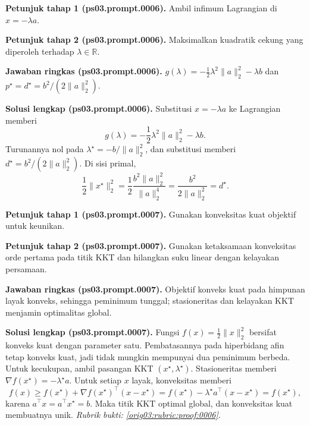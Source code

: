 \par\noindent\textbf{Petunjuk tahap 1 (ps03.prompt.0006).}
Ambil infimum Lagrangian di $x=-\lambda a$.
\label{orig03:ps03:hint1:0006}
\par\noindent\textbf{Petunjuk tahap 2 (ps03.prompt.0006).}
Maksimalkan kuadratik cekung yang diperoleh terhadap $\lambda\in\mathbb{R}$.
\label{orig03:ps03:hint2:0006}
\par\noindent\textbf{Jawaban ringkas (ps03.prompt.0006).}
$g(\lambda)=-\tfrac12\lambda^2\lVert a\rVert_2^2-\lambda b$ dan
$p^\star=d^\star=b^2/(2\lVert a\rVert_2^2)$.
\label{orig03:ps03:answer:0006}
\par\noindent\textbf{Solusi lengkap (ps03.prompt.0006).}
Substitusi $x=-\lambda a$ ke Lagrangian memberi
\[
 g(\lambda)=-\frac12\lambda^2\lVert a\rVert_2^2-\lambda b.
\]
Turunannya nol pada
$\lambda^\star=-b/\lVert a\rVert_2^2$, dan substitusi memberi
$d^\star=b^2/(2\lVert a\rVert_2^2)$. Di sisi primal,
\[
 \frac12\lVert x^\star\rVert_2^2
 =\frac12\frac{b^2\lVert a\rVert_2^2}{\lVert a\rVert_2^4}
 =\frac{b^2}{2\lVert a\rVert_2^2}=d^\star.
\]
\label{orig03:ps03:solution:0006}

\par\noindent\textbf{Petunjuk tahap 1 (ps03.prompt.0007).}
Gunakan konveksitas kuat objektif untuk keunikan.
\label{orig03:ps03:hint1:0007}
\par\noindent\textbf{Petunjuk tahap 2 (ps03.prompt.0007).}
Gunakan ketaksamaan konveksitas orde pertama pada titik KKT dan hilangkan
suku linear dengan kelayakan persamaan.
\label{orig03:ps03:hint2:0007}
\par\noindent\textbf{Jawaban ringkas (ps03.prompt.0007).}
Objektif konveks kuat pada himpunan layak konveks, sehingga peminimum tunggal;
stasioneritas dan kelayakan KKT menjamin optimalitas global.
\label{orig03:ps03:answer:0007}
\par\noindent\textbf{Solusi lengkap (ps03.prompt.0007).}
Fungsi $f(x)=\tfrac12\lVert x\rVert_2^2$ bersifat konveks kuat dengan
parameter satu. Pembatasannya pada hiperbidang afin tetap konveks kuat, jadi
tidak mungkin mempunyai dua peminimum berbeda. Untuk kecukupan, ambil
pasangan KKT $(x^\star,\lambda^\star)$. Stasioneritas memberi
$\nabla f(x^\star)=-\lambda^\star a$. Untuk setiap $x$ layak, konveksitas
memberi
\[
 f(x)\geq f(x^\star)+\nabla f(x^\star)^\top(x-x^\star)
 =f(x^\star)-\lambda^\star a^\top(x-x^\star)=f(x^\star),
\]
karena $a^\top x=a^\top x^\star=b$. Maka titik KKT optimal global, dan
konveksitas kuat membuatnya unik.
\emph{Rubrik bukti: \ref{orig03:rubric:proof:0006}.}
\label{orig03:ps03:solution:0007}

